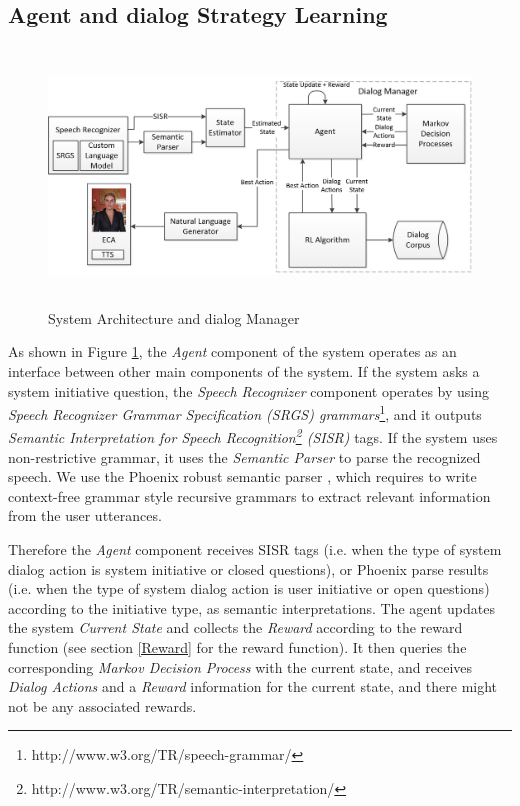 \begin{sloppy}
\subsection{Agent and dialog Strategy Learning}
\label{Agent}


\begin{figure}
\centering
\includegraphics[height=68mm]{img/SystemArchWithStateEstimator.png}
\caption{System Architecture and dialog Manager}
\label{SysArch}
\end{figure}

As shown in  Figure \ref{SysArch}, the {\em Agent} component of the system operates as an interface between other main components of the system. If the system asks a system initiative question, the {\em Speech Recognizer} component operates by using {\em Speech Recognizer Grammar Specification (SRGS) grammars}\footnote{http://www.w3.org/TR/speech-grammar/}, and it outputs {\em Semantic Interpretation for Speech Recognition\footnote{http://www.w3.org/TR/semantic-interpretation/} (SISR)} tags. 
If the system uses non-restrictive grammar, it uses the {\em Semantic Parser} to parse the recognized speech. We use the Phoenix robust semantic parser \cite{PhoenixParser1991}, which requires to write context-free grammar style recursive grammars to extract relevant information from the user utterances. 

Therefore the \textit{Agent} component receives SISR tags (i.e. when the type of system dialog action is system initiative or closed questions), or Phoenix  parse results (i.e. when the type of system dialog action is user initiative or open questions) according to the initiative type, as semantic interpretations. The agent updates the system {\em Current State} and collects the {\em Reward} according to the reward function (see section \ref{Reward} for the reward function). It then queries the corresponding {\em Markov Decision Process} with the current state, and receives {\em Dialog Actions} and a {\em Reward}  information for the current state, and there might not be any associated rewards.


\end{sloppy}
